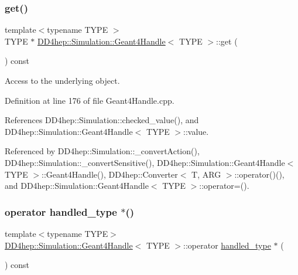 \subsubsection{\texorpdfstring{get()}{get()}}
{\footnotesize\ttfamily template$<$typename T\+Y\+PE $>$ \\
T\+Y\+PE $\ast$ \hyperlink{class_d_d4hep_1_1_simulation_1_1_geant4_handle}{D\+D4hep\+::\+Simulation\+::\+Geant4\+Handle}$<$ T\+Y\+PE $>$\+::get (\begin{DoxyParamCaption}{ }\end{DoxyParamCaption}) const}



Access to the underlying object. 



Definition at line 176 of file Geant4\+Handle.\+cpp.



References D\+D4hep\+::\+Simulation\+::checked\+\_\+value(), and D\+D4hep\+::\+Simulation\+::\+Geant4\+Handle$<$ T\+Y\+P\+E $>$\+::value.



Referenced by D\+D4hep\+::\+Simulation\+::\+\_\+convert\+Action(), D\+D4hep\+::\+Simulation\+::\+\_\+convert\+Sensitive(), D\+D4hep\+::\+Simulation\+::\+Geant4\+Handle$<$ T\+Y\+P\+E $>$\+::\+Geant4\+Handle(), D\+D4hep\+::\+Converter$<$ T, A\+R\+G $>$\+::operator()(), and D\+D4hep\+::\+Simulation\+::\+Geant4\+Handle$<$ T\+Y\+P\+E $>$\+::operator=().

\hypertarget{class_d_d4hep_1_1_simulation_1_1_geant4_handle_ad8fdc050089c04e746dc5031663afcf8}{}\label{class_d_d4hep_1_1_simulation_1_1_geant4_handle_ad8fdc050089c04e746dc5031663afcf8} 
\subsubsection{\texorpdfstring{operator handled\+\_\+type $\ast$()}{operator handled\_type *()}}
{\footnotesize\ttfamily template$<$typename T\+Y\+PE$>$ \\
\hyperlink{class_d_d4hep_1_1_simulation_1_1_geant4_handle}{D\+D4hep\+::\+Simulation\+::\+Geant4\+Handle}$<$ T\+Y\+PE $>$\+::operator \hyperlink{class_d_d4hep_1_1_simulation_1_1_geant4_handle_a35e583b9228e38c95d23112ad19b645d}{handled\+\_\+type} $\ast$ (\begin{DoxyParamCaption}{ }\end{DoxyParamCaption}) const}




